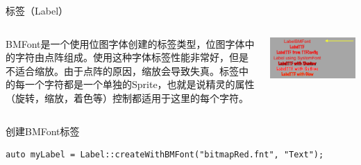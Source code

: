 \documentclass{beamer}
\begin{document}
\begin{frame}[fragile]{标签（Label）}
\begin{columns}
\begin{column}{0.4\textwidth}
BMFont是一个使用位图字体创建的标签类型，位图字体中的字符由点阵组成。使用这种字体标签性能非常好，但是不适合缩放。由于点阵的原因，缩放会导致失真。标签中的每一个字符都是一个单独的Sprite，也就是说精灵的属性（旋转，缩放，着色等）控制都适用于这里的每个字符。
\end{column}
\begin{column}{0.6\textwidth}
\includegraphics[width=\textwidth]
{figures/label_1}
\end{column}
\end{columns}
\begin{block}{创建BMFont标签}
\begin{verbatim}
auto myLabel = Label::createWithBMFont("bitmapRed.fnt", "Text");
\end{verbatim}
\end{block}
\end{frame}

\end{document}
